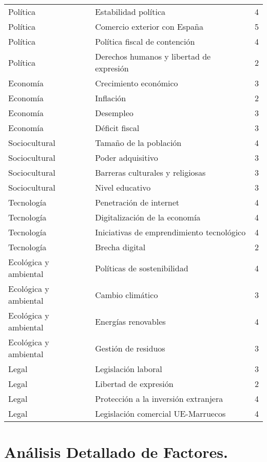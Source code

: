 \documentclass{article}  %
\begin{document}
\begin{longtable}{|l|l|c|}
\hline
Política & Estabilidad política         & 4 \\
Política & Comercio exterior con España & 5 \\
Política & Política fiscal de contención & 4 \\
Política & Derechos humanos y libertad de expresión & 2 \\
\hline
Economía & Crecimiento económico        & 3 \\
Economía & Inflación                    & 2 \\
Economía & Desempleo                    & 3 \\
Economía & Déficit fiscal               & 3 \\
\hline
Sociocultural & Tamaño de la población       & 4 \\
Sociocultural & Poder adquisitivo            & 3 \\
Sociocultural & Barreras culturales y religiosas & 3 \\
Sociocultural & Nivel educativo              & 3 \\
\hline
Tecnología & Penetración de internet      & 4 \\
Tecnología & Digitalización de la economía & 4 \\
Tecnología & Iniciativas de emprendimiento tecnológico & 4 \\
Tecnología & Brecha digital               & 2 \\
\hline
Ecológica y ambiental & Políticas de sostenibilidad & 4 \\
Ecológica y ambiental & Cambio climático             & 3 \\
Ecológica y ambiental & Energías renovables          & 4 \\
Ecológica y ambiental & Gestión de residuos          & 3 \\
\hline
Legal & Legislación laboral          & 3 \\
Legal & Libertad de expresión        & 2 \\
Legal & Protección a la inversión extranjera & 4 \\
Legal & Legislación comercial UE-Marruecos & 4 \\
\hline
\end{longtable}


\section{Análisis Detallado de
Factores.}\label{anuxe1lisis-detallado-de-factores.}
\end{document}
